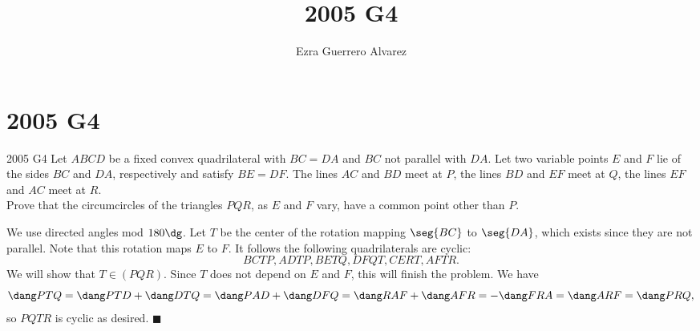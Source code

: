 \documentclass[14pt]{article}
\title{2005 G4}
\author{Ezra Guerrero Alvarez}
\begin{document}
\maketitle
	
\section*{2005 G4}

\begin{statement}{2005 G4}
	Let $ABCD$ be a fixed convex quadrilateral with $BC=DA$ and $BC$ not parallel with $DA$. Let two variable points $E$ and $F$ lie of the sides $BC$ and $DA$, respectively and satisfy $BE=DF$. The lines $AC$ and $BD$ meet at $P$, the lines $BD$ and $EF$ meet at $Q$, the lines $EF$ and $AC$ meet at $R$.\\
	Prove that the circumcircles of the triangles $PQR$, as $E$ and $F$ vary, have a common point other than $P$.
\end{statement}
We use directed angles mod $180\dg$. Let $T$ be the center of the rotation mapping $\seg{BC}$ to $\seg{DA}$, which exists since they are not parallel. Note that this rotation maps $E$ to $F$. It follows the following quadrilaterals are cyclic:
\[ BCTP,ADTP,BETQ,DFQT,CERT,AFTR. \]
We will show that $T\in(PQR)$. Since $T$ does not depend on $E$ and $F$, this will finish the problem. We have
\[ \dang PTQ = \dang PTD + \dang DTQ = \dang PAD + \dang DFQ = \dang RAF + \dang AFR = -\dang FRA = \dang ARF = \dang PRQ, \]
so $PQTR$ is cyclic as desired. $\blacksquare$
	
\end{document}

